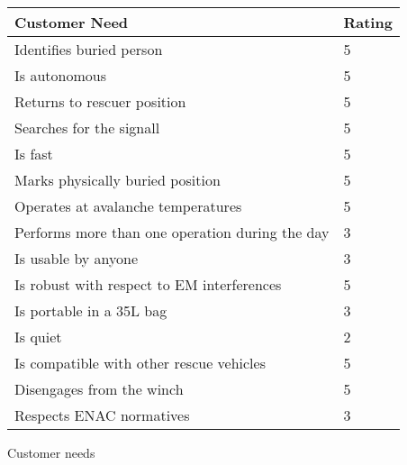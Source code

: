 \begin{margintable}
	\begin{center}
		\begin{tabular}{ p{3.7cm} p{0.7cm} }
			\hline \textbf{Customer Need} & \textbf{Rating} \\ \hline
			Identifies buried person & 5 \\
			Is autonomous & 5 \\
			Returns to rescuer position & 5 \\
			Searches for the signall & 5 \\
			Is fast & 5 \\
			Marks physically buried position & 5 \\
			Operates at avalanche temperatures & 5 \\
			Performs more than one operation during the day & 3 \\
			Is usable by anyone & 3 \\
			Is robust with respect to EM interferences & 5 \\
			Is portable in a \num{35}\si{\liter} bag & 3 \\
			Is quiet & 2 \\
			Is compatible with other rescue vehicles & 5 \\
			Disengages from the winch & 5 \\
			Respects ENAC normatives & 3 \\
			\hline
		\end{tabular}
	\end{center}
	\caption{Customer needs \label{tbl:customer_needs}}
\end{margintable}